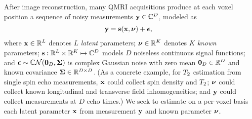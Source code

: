 After image reconstruction,
many QMRI acquisitions 
produce at each voxel position
a sequence of noisy measurements
$\mathbf{y} \in \mathbb{C}^{D}$, 
modeled as
\begin{align}
	\bmy = \bmsa{\bmx, \bmnu} + \bmeps,
	\label{eq,model}
\end{align}
where $\mathbf{x} \in \mathbb{R}^{L}$ denotes $L$ \emph{latent} parameters;
$\boldsymbol{\nu} \in \mathbb{R}^{K}$ denotes $K$ \emph{known} parameters;  
$\mathbf{s} : \mathbb{R}^{L} \times \mathbb{R}^{K} \mapsto \mathbb{C}^{D}$ 
models $D$ noiseless continuous signal functions;
and $\bmeps \sim \cgauss{\zeros{D}}{\bmSig}$ is complex Gaussian noise
with zero mean $\boldsymbol{0}_{D} \in \mathbb{R}^{D}$
and known covariance $\boldsymbol{\Sigma} \in \mathbb{R}^{D \times D}$.
(As a concrete example,
for $T_2$ estimation
from single spin echo measurements,
$\mathbf{x}$ could collect spin density and $T_2$;
$\boldsymbol{\nu}$ could collect known longitudinal and transverse field inhomogeneities;
and 
$\mathbf{y}$ could collect measurements at $D$ echo times.)
We seek to estimate 
on a per-voxel basis
each latent parameter $\mathbf{x}$
from measurement $\mathbf{y}$ 
and known parameter $\boldsymbol{\nu}$.

